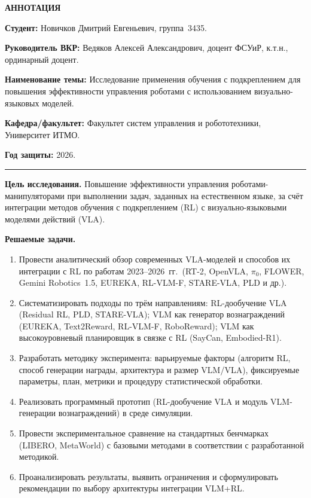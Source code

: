 \thispagestyle{empty}

\begin{center}
    \textbf{АННОТАЦИЯ}
\end{center}

\vspace{10pt}

\noindent\textbf{Студент:} Новичков Дмитрий Евгеньевич, группа~3435.

\noindent\textbf{Руководитель ВКР:} Ведяков Алексей Александрович, доцент ФСУиР, к.т.н., ординарный доцент.

\noindent\textbf{Наименование темы:} Исследование применения обучения с подкреплением для повышения эффективности управления роботами с использованием визуально-языковых моделей.

\noindent\textbf{Кафедра/факультет:} Факультет систем управления и робототехники, Университет ИТМО.

\noindent\textbf{Год защиты:} 2026.

\vspace{8pt}
\noindent\rule{\textwidth}{0.4pt}
\vspace{4pt}

\noindent\textbf{Цель исследования.}
Повышение эффективности управления роботами-манипуляторами при выполнении задач, заданных на естественном языке, за счёт интеграции методов обучения с подкреплением (RL) с визуально-языковыми моделями действий (VLA).

\vspace{6pt}
\noindent\textbf{Решаемые задачи.}
\begin{enumerate}[noitemsep, topsep=2pt]
    \item Провести аналитический обзор современных VLA-моделей и способов их интеграции с RL по работам 2023--2026~гг.\ (RT-2, OpenVLA, $\pi_0$, FLOWER, Gemini Robotics~1.5, EUREKA, RL-VLM-F, STARE-VLA, PLD и др.).
    \item Систематизировать подходы по трём направлениям: RL-дообучение VLA (Residual RL, PLD, STARE-VLA); VLM как генератор вознаграждений (EUREKA, Text2Reward, RL-VLM-F, RoboReward); VLM как высокоуровневый планировщик в связке с RL (SayCan, Embodied-R1).
    \item Разработать методику эксперимента: варьируемые факторы (алгоритм RL, способ генерации награды, архитектура и размер VLM/VLA), фиксируемые параметры, план, метрики и процедуру статистической обработки.
    \item Реализовать программный прототип (RL-дообучение VLA и модуль VLM-генерации вознаграждений) в среде симуляции.
    \item Провести экспериментальное сравнение на стандартных бенчмарках (LIBERO, MetaWorld) с базовыми методами в соответствии с разработанной методикой.
    \item Проанализировать результаты, выявить ограничения и сформулировать рекомендации по выбору архитектуры интеграции VLM+RL.
\end{enumerate}

